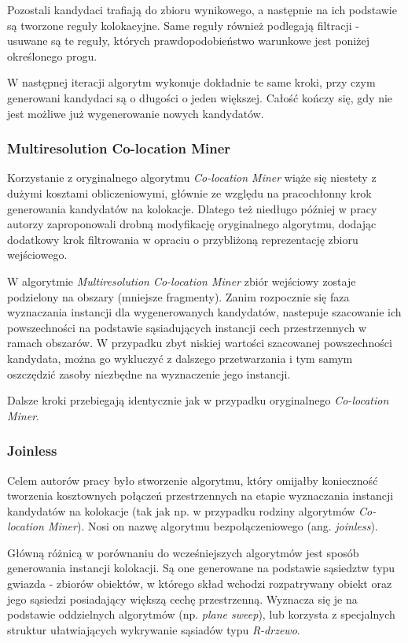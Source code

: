 \documentclass[12pt]{article}
\begin{document}
Pozostali kandydaci trafiają do zbioru wynikowego, a następnie na ich podstawie są tworzone reguły kolokacyjne. Same reguły również podlegają filtracji - usuwane są te reguły, których prawdopodobieństwo warunkowe jest poniżej określonego progu. 

W następnej iteracji algorytm wykonuje dokładnie te same kroki, przy czym generowani kandydaci są o długości o jeden większej. Całość kończy się, gdy nie jest możliwe już wygenerowanie nowych kandydatów.

\subsubsection{Multiresolution Co-location Miner}

Korzystanie z oryginalnego algorytmu \textit{Co-location Miner} wiąże się niestety z dużymi kosztami obliczeniowymi, głównie ze względu na pracochłonny krok generowania kandydatów na kolokacje. Dlatego też niedługo później w pracy \cite{multihuang} autorzy zaproponowali drobną modyfikację oryginalnego algorytmu, dodając dodatkowy krok filtrowania w opraciu o przybliżoną reprezentację zbioru wejściowego.

W algorytmie \textit{Multiresolution Co-location Miner} zbiór wejściowy zostaje podzielony na obszary (mniejsze fragmenty). Zanim rozpocznie się faza wyznaczania instancji dla wygenerowanych kandydatów, nastepuje szacowanie ich powszechności na podstawie sąsiadujących instancji cech przestrzennych w ramach obszarów. W przypadku zbyt niskiej wartości szacowanej powszechności kandydata, można go wykluczyć z dalszego przetwarzania i tym samym oszczędzić zasoby niezbędne na wyznaczenie jego instancji.

Dalsze kroki przebiegają identycznie jak w przypadku oryginalnego \textit{Co-location Miner}.

\subsubsection{Joinless}

Celem autorów pracy \cite{joinless} było stworzenie algorytmu, który omijałby konieczność tworzenia kosztownych połączeń przestrzennych na etapie wyznaczania instancji kandydatów na kolokacje (tak jak np. w przypadku rodziny algorytmów \textit{Co-location Miner}). Nosi on nazwę algorytmu bezpołączeniowego (ang. \textit{joinless}).

Główną różnicą w porównaniu do wcześniejszych algorytmów jest sposób generowania instancji kolokacji. Są one generowane na podstawie sąsiedztw typu gwiazda - zbiorów obiektów, w którego skład wchodzi rozpatrywany obiekt oraz jego sąsiedzi posiadający większą cechę przestrzenną. Wyznacza się je na podstawie oddzielnych algorytmów (np. \textit{plane sweep}), lub korzysta z specjalnych struktur ułatwiających wykrywanie sąsiadów typu \textit{R-drzewo}.
\end{document}
